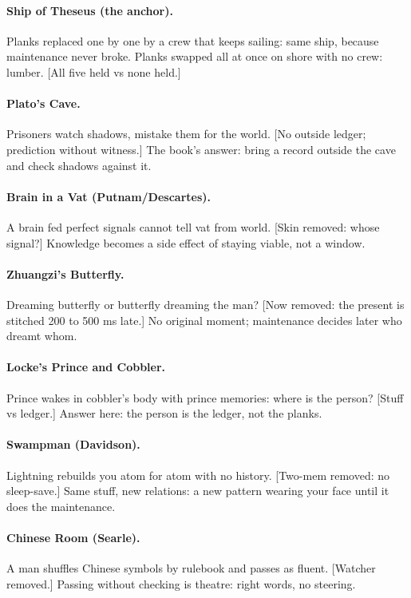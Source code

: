 \paragraph{Ship of Theseus (the anchor).} Planks replaced one by one by a crew that keeps sailing: same ship, because maintenance never broke. Planks swapped all at once on shore with no crew: lumber. [All five held vs none held.]

\paragraph{Plato's Cave.} Prisoners watch shadows, mistake them for the world. [No outside ledger; prediction without witness.] The book's answer: bring a record outside the cave and check shadows against it.

\paragraph{Brain in a Vat (Putnam/Descartes).} A brain fed perfect signals cannot tell vat from world. [Skin removed: whose signal?] Knowledge becomes a side effect of staying viable, not a window.

\paragraph{Zhuangzi's Butterfly.} Dreaming butterfly or butterfly dreaming the man? [Now removed: the present is stitched 200 to 500 ms late.] No original moment; maintenance decides later who dreamt whom.

\paragraph{Locke's Prince and Cobbler.} Prince wakes in cobbler's body with prince memories: where is the person? [Stuff vs ledger.] Answer here: the person is the ledger, not the planks.

\paragraph{Swampman (Davidson).} Lightning rebuilds you atom for atom with no history. [Two-mem removed: no sleep-save.] Same stuff, new relations: a new pattern wearing your face until it does the maintenance.

\paragraph{Chinese Room (Searle).} A man shuffles Chinese symbols by rulebook and passes as fluent. [Watcher removed.] Passing without checking is theatre: right words, no steering.

